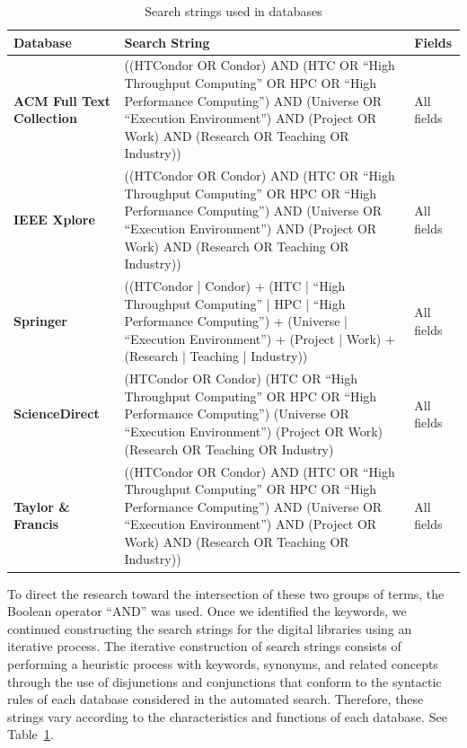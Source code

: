 \begin{table}[htbp]
	\centering
	\caption{Search strings used in databases}
	\label{table:cadenas_de_busqueda}
	\renewcommand{\arraystretch}{1}  %
	\begin{tabular}{p{3.2cm}p{11cm}p{2.5cm}}
		\toprule
		\textbf{Database}            & \textbf{Search String}                                                                                                                                                                                        & \textbf{Fields}  \\
		\midrule
		\textbf{ACM Full Text Collection} & ((HTCondor OR Condor) AND (HTC OR ``High Throughput Computing'' OR HPC OR ``High Performance Computing'') AND (Universe OR ``Execution Environment'') AND (Project OR Work) AND (Research OR Teaching OR Industry)) & All fields \\
		\addlinespace[0.8em]
		\textbf{IEEE Xplore}              & ((HTCondor OR Condor) AND (HTC OR ``High Throughput Computing'' OR HPC OR ``High Performance Computing'') AND (Universe OR ``Execution Environment'') AND (Project OR Work) AND (Research OR Teaching OR Industry)) & All fields \\
		\addlinespace[0.8em]
		\textbf{Springer}                 & ((HTCondor | Condor) + (HTC | ``High Throughput Computing'' | HPC | ``High Performance Computing'') + (Universe | ``Execution Environment'') + (Project | Work) + (Research | Teaching | Industry))                & All fields \\
		\addlinespace[0.8em]
		\textbf{ScienceDirect}            & (HTCondor OR Condor) (HTC OR ``High Throughput Computing'' OR HPC OR ``High Performance Computing'') (Universe OR ``Execution Environment'') (Project OR Work) (Research OR Teaching OR Industry)                  & All fields \\
		\addlinespace[0.8em]
		\textbf{Taylor \& Francis}        & ((HTCondor OR Condor) AND (HTC OR ``High Throughput Computing'' OR HPC OR ``High Performance Computing'') AND (Universe OR ``Execution Environment'') AND (Project OR Work) AND (Research OR Teaching OR Industry))   & All fields \\
		\bottomrule
	\end{tabular}
\end{table}


To direct the research toward the intersection of these two groups of terms, the Boolean operator ``AND'' was used. Once we identified the keywords, we continued constructing the search strings for the digital libraries using an iterative process. The iterative construction of search strings consists of performing a heuristic process with keywords, synonyms, and related concepts through the use of disjunctions and conjunctions that conform to the syntactic rules of each database considered in the automated search. Therefore, these strings vary according to the characteristics and functions of each database. See Table~\ref{table:cadenas_de_busqueda}.

